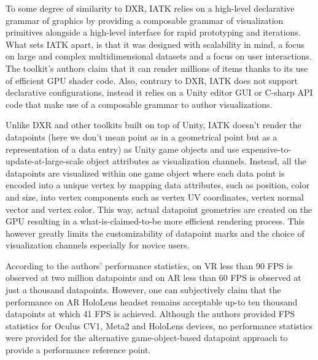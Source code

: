 \documentclass{vgtc}                          %
\begin{document}
\smallskip

\noindent To some degree of similarity to DXR, IATK relies on a high-level
declarative grammar of graphics by providing a composable grammar of
visualization primitives alongside a high-level interface for rapid prototyping
and iterations. What sets IATK apart, is that it was designed with scalability
in mind, a focus on large and complex multidimensional datasets and a focus on
user interactions. The toolkit's authors claim that it can render millions of
items thanks to its use of efficient GPU shader code. Also, contrary to DXR,
IATK does not support declarative configurations, instead it relies on a Unity
editor GUI or C-sharp API code that make use of a composable grammar to author
visualizations.

\smallskip

\noindent Unlike DXR and other toolkits built on top of Unity, IATK doesn't
render the datapoints (here we don't mean point as in a geometrical point but
as a representation of a data entry) as Unity game objects and use
expensive-to-update-at-large-scale object attributes as visualization channels.
Instead, all the datapoints are visualized within one game object where each
data point is encoded into a unique vertex by mapping data attributes,
such as position, color and size, into vertex components such as vertex UV
coordinates, vertex normal vector and vertex color. This way, actual datapoint
geometries are created on the GPU resulting in a what-is-claimed-to-be more
efficient rendering process. This however greatly limits the customizability
of datapoint marks and the choice of visualization channels especially for
novice users.

\smallskip

\noindent According to the authors' performance statistics, on VR less than
90 FPS is observed at two million datapoints and on AR less than 60 FPS is
observed at just a thousand datapoints. However, one can subjectively claim
that the performance on AR HoloLens headset remains acceptable up-to ten
thousand datapoints at which 41 FPS is achieved. Although the authors provided
FPS statistics for Oculus CV1, Meta2 and HoloLens devices, no performance
statistics were provided for the alternative game-object-based datapoint
approach to provide a performance reference point.
\end{document}
